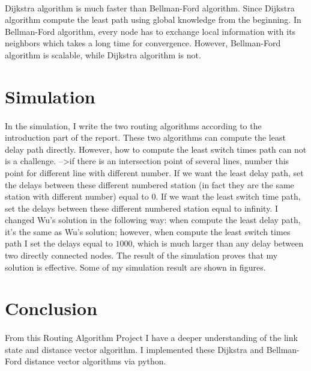 \documentclass[12pt]{article}
\begin{document}
\paragraph{}
Dijkstra algorithm is much faster than Bellman-Ford algorithm. Since Dijkstra algorithm compute the least path using global knowledge from the beginning. In Bellman-Ford algorithm, every node has to exchange local information with its neighbors which takes a long time for convergence. However, Bellman-Ford algorithm is scalable, while Dijkstra algorithm is not. 




\section{Simulation}
\paragraph{}

In the simulation, I write the two routing algorithms according to the introduction part of the report. These two algorithms can compute the  least delay path directly. However, how to compute the least switch times path can not is a challenge. -->if there is an intersection point of several lines, number this point for different line with different number. If we want the least delay path, set the delays between these different numbered station (in fact they are the same station with different number) equal to 0. If we want the least switch time path, set the delays between these different numbered station equal to infinity. I changed Wu's solution in the following way: when compute the least delay path, it's the same as Wu's solution; however, when compute the least switch times path I set the delays equal to $1000$, which is much larger than any delay between two directly connected nodes. The result of the simulation proves that my solution is effective. Some of my simulation result are shown in figures.


\section{Conclusion}
\paragraph{}From this Routing Algorithm Project I have a deeper understanding of the link state and distance vector algorithm. I implemented these Dijkstra and Bellman-Ford distance vector algorithms via python.
\end{document}
